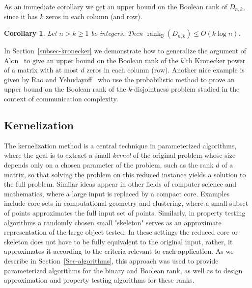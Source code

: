 \documentclass[11pt]{article}
\newtheorem{corollary}[theorem]{Corollary}
\newcommand{\rank}{\mathop{\mathrm{rank}}}
\newcommand{\Rbool}{{\rank}_\mathbb{B}}
\begin{document}
As an immediate corollary we get an upper bound on the Boolean rank of $D_{n,k}$, since it has $k$ zeros in each column (and row).

\begin{corollary}
\label{coro-boolDnk}
Let $n > k \geq 1$ be integers. Then $\Rbool(D_{n,k}) \leq O(k\log n)$.
\end{corollary}

In Section~\ref{subsec-kronecker} we demonstrate how to generalize the argument of Alon~\cite{alon1986covering} to give an upper bound on the Boolean rank of
the $k$'th Kronecker power of a matrix with at most $d$ zeros in each column (row).
Another nice example is given by Rao and Yehudayoff~\cite{rao2020communication} who use the probabilistic method to prove an upper bound on the Boolean rank
of the $k$-disjointness problem studied in the context of communication complexity.


\subsection{Kernelization}
\label{Sec-kernel}
The kernelization method is a central technique in parameterized algorithms,
where the goal is to extract a small {\em kernel} of the original problem whose size depends only on a chosen parameter of the problem, such as the rank $d$ of a matrix,
so that solving the problem on this reduced instance yields a solution to the full problem.
Similar ideas appear in other fields of computer science and mathematics, where a large input is replaced by a compact core.
Examples include core-sets in computational geometry and clustering, where  a small subset of points approximates the full input set of points.
Similarly, in property testing algorithms a randomly chosen small "skeleton" serves as an approximate representation of the large object tested.
In these settings the reduced core or skeleton does not have to be fully equivalent to the original input, rather, it approximates it according to the criteria relevant to each application.
As we describe in Section~\ref{Sec-algorithms}, this approach was used to provide parameterized algorithms for the binary and Boolean rank,
as well as to design approximation and property testing algorithms for these ranks.
\end{document}
